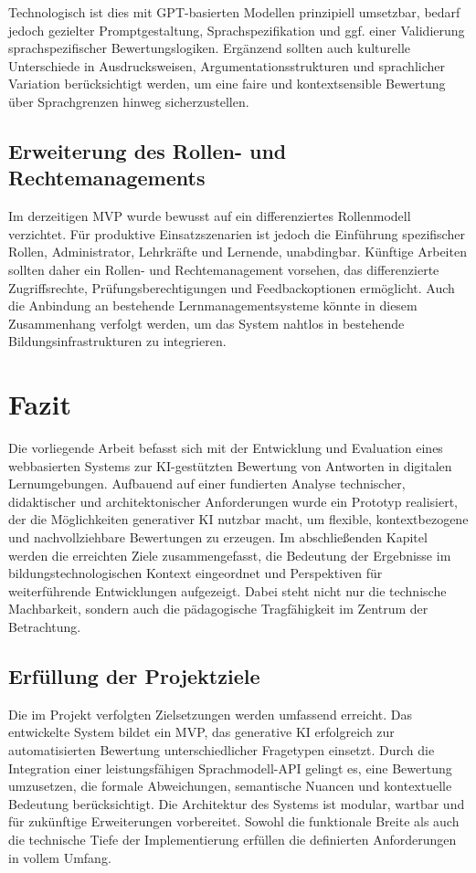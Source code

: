 \documentclass[a4paper,12pt]{article}
\begin{document}
Technologisch ist dies mit GPT-basierten Modellen prinzipiell umsetzbar, bedarf jedoch gezielter Promptgestaltung, Sprachspezifikation und ggf. einer Validierung sprachspezifischer Bewertungslogiken. Ergänzend sollten auch kulturelle Unterschiede in Ausdrucksweisen, Argumentationsstrukturen und sprachlicher Variation berücksichtigt werden, um eine faire und kontextsensible Bewertung über Sprachgrenzen hinweg sicherzustellen.

\subsection{Erweiterung des Rollen- und Rechtemanagements}

Im derzeitigen MVP wurde bewusst auf ein differenziertes Rollenmodell verzichtet. Für produktive Einsatzszenarien ist jedoch die Einführung spezifischer Rollen, Administrator, Lehrkräfte und Lernende, unabdingbar. Künftige Arbeiten sollten daher ein Rollen- und Rechtemanagement vorsehen, das differenzierte Zugriffsrechte, Prüfungsberechtigungen und Feedbackoptionen ermöglicht. Auch die Anbindung an bestehende Lernmanagementsysteme könnte in diesem Zusammenhang verfolgt werden, um das System nahtlos in bestehende Bildungsinfrastrukturen zu integrieren.

\newpage

\section{Fazit}
Die vorliegende Arbeit befasst sich mit der Entwicklung und Evaluation eines webbasierten Systems zur KI-gestützten Bewertung von Antworten in digitalen Lernumgebungen. Aufbauend auf einer fundierten Analyse technischer, didaktischer und architektonischer Anforderungen wurde ein Prototyp realisiert, der die Möglichkeiten generativer KI nutzbar macht, um flexible, kontextbezogene und nachvollziehbare Bewertungen zu erzeugen. Im abschließenden Kapitel werden die erreichten Ziele zusammengefasst, die Bedeutung der Ergebnisse im bildungstechnologischen Kontext eingeordnet und Perspektiven für weiterführende Entwicklungen aufgezeigt. Dabei steht nicht nur die technische Machbarkeit, sondern auch die pädagogische Tragfähigkeit im Zentrum der Betrachtung.

\subsection{Erfüllung der Projektziele}
Die im Projekt verfolgten Zielsetzungen werden umfassend erreicht. Das entwickelte System bildet ein MVP, das generative KI erfolgreich zur automatisierten Bewertung unterschiedlicher Fragetypen einsetzt. Durch die Integration einer leistungsfähigen Sprachmodell-API gelingt es, eine Bewertung umzusetzen, die formale Abweichungen, semantische Nuancen und kontextuelle Bedeutung berücksichtigt. Die Architektur des Systems ist modular, wartbar und für zukünftige Erweiterungen vorbereitet. Sowohl die funktionale Breite als auch die technische Tiefe der Implementierung erfüllen die definierten Anforderungen in vollem Umfang.
\end{document}
